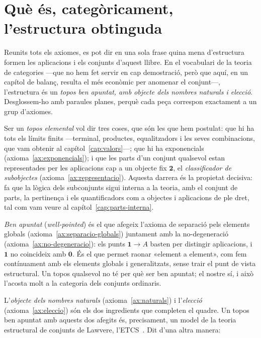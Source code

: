 \section{Què és, categòricament, l'estructura obtinguda}\label{sec:caracteritzacio}

Reunits tots els axiomes, es pot dir en una sola frase quina mena
d'estructura formen les aplicacions i els conjunts d'aquest llibre. En el
vocabulari de la teoria de categories ---que no hem fet servir en cap
demostració, però que aquí, en un capítol de balanç, resulta el més
econòmic per anomenar el conjunt---, l'estructura és un \emph{topos ben
apuntat, amb objecte dels nombres naturals i elecció}. Desglossem-ho amb
paraules planes, perquè cada peça correspon exactament a un grup
d'axiomes.

Ser un \emph{topos elemental} vol dir tres coses, que són les que hem
postulat: que hi ha tots els límits finits ---terminal, productes,
equalitzadors i les seves combinacions, que vam obtenir al
capítol~\ref{cap:valors}---; que hi ha exponencials
(axioma~\ref{ax:exponencials}); i que les parts d'un conjunt qualsevol
estan representades per les aplicacions cap a un objecte fix \(\mathbf2\),
el \emph{classificador de subobjectes} (axioma~\ref{ax:representacio}).
Aquesta darrera és la propietat decisiva: fa que la lògica dels
subconjunts sigui interna a la teoria, amb el conjunt de parts, la
pertinença i els quantificadors com a objectes i aplicacions de ple dret,
tal com vam veure al capítol~\ref{cap:parts-interna}.

\emph{Ben apuntat} (\emph{well-pointed}) és el que afegeix l'axioma de separació pels elements
globals (axioma~\ref{ax:separacio-globals}) juntament amb la
no-degeneració (axioma~\ref{ax:no-degeneracio}): els punts
\(\mathbf1\to A\) basten per distingir aplicacions, i \(\mathbf1\) no
coincideix amb \(\mathbf0\). És el que permet raonar «element a element»,
com fem contínuament amb els elements globals i generalitzats, sense
trair el punt de vista estructural. Un topos qualsevol no té per què ser
ben apuntat; el nostre sí, i això l'acosta molt a la categoria dels
conjunts ordinaris.

L'\emph{objecte dels nombres naturals} (axioma~\ref{ax:naturals}) i
l'\emph{elecció} (axioma~\ref{ax:eleccio}) són els dos ingredients que
completen el quadre. Un topos ben apuntat amb aquests dos afegits és,
precisament, un model de la teoria estructural de conjunts de Lawvere,
l'ETCS~\cite{lawvere1964,lawvere-etcs-reprint}. Dit d'una altra manera:


